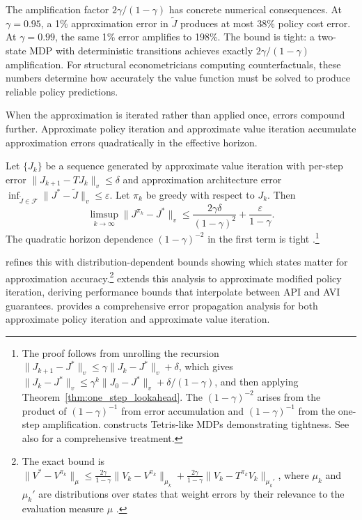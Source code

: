 The amplification factor $2\gamma/(1-\gamma)$ has concrete numerical consequences. At $\gamma = 0.95$, a 1\% approximation error in $\tilde{J}$ produces at most 38\% policy cost error. At $\gamma = 0.99$, the same 1\% error amplifies to 198\%. The bound is tight: a two-state MDP with deterministic transitions achieves exactly $2\gamma/(1-\gamma)$ amplification. For structural econometricians computing counterfactuals, these numbers determine how accurately the value function must be solved to produce reliable policy predictions.

When the approximation is iterated rather than applied once, errors compound further. Approximate policy iteration and approximate value iteration accumulate approximation errors quadratically in the effective horizon.

\begin{theorem}
\label{thm:avi_error}
Let $\{J_k\}$ be a sequence generated by approximate value iteration with per-step error $\|J_{k+1} - TJ_k\|_v \leq \delta$ and approximation architecture error $\inf_{\tilde{J} \in \mathcal{F}} \|J^* - \tilde{J}\|_v \leq \varepsilon$. Let $\pi_k$ be greedy with respect to $J_k$. Then
\[
\limsup_{k \to \infty} \|J^{\pi_k} - J^*\|_v \leq \frac{2\gamma\delta}{(1-\gamma)^2} + \frac{\varepsilon}{1-\gamma}.
\]
The quadratic horizon dependence $(1-\gamma)^{-2}$ in the first term is tight \citep{scherrer2015}.\footnote{The proof follows from unrolling the recursion $\|J_{k+1} - J^*\|_v \leq \gamma \|J_k - J^*\|_v + \delta$, which gives $\|J_k - J^*\|_v \leq \gamma^k \|J_0 - J^*\|_v + \delta/(1-\gamma)$, and then applying Theorem~\ref{thm:one_step_lookahead}. The $(1-\gamma)^{-2}$ arises from the product of $(1-\gamma)^{-1}$ from error accumulation and $(1-\gamma)^{-1}$ from the one-step amplification. \citet{scherrer2015} constructs Tetris-like MDPs demonstrating tightness. See also \citet{farahmand2010} for a comprehensive treatment.}
\end{theorem}

\citet{munos2003} refines this with distribution-dependent bounds showing which states matter for approximation accuracy.\footnote{The exact bound is $\|V^* - V^{\pi_k}\|_\mu \leq \frac{2\gamma}{1-\gamma}\|V_k - V^{\pi_k}\|_{\mu_k} + \frac{2\gamma}{1-\gamma}\|V_k - T^{\pi_k}V_k\|_{\mu_k'}$, where $\mu_k$ and $\mu_k'$ are distributions over states that weight errors by their relevance to the evaluation measure $\mu$ \citep{munos2003}.} \citet{scherrer2015} extends this analysis to approximate modified policy iteration, deriving performance bounds that interpolate between API and AVI guarantees. \citet{farahmand2010} provides a comprehensive error propagation analysis for both approximate policy iteration and approximate value iteration.


